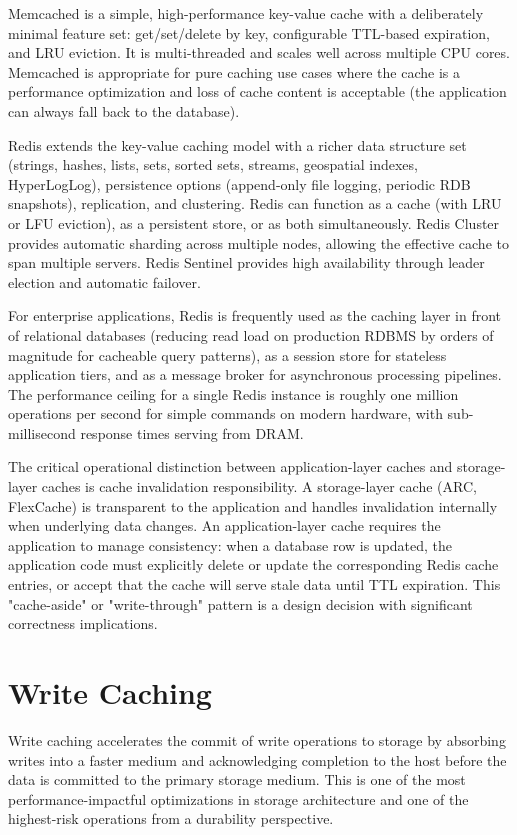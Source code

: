 Memcached is a simple, high-performance key-value cache with a deliberately minimal feature set: get/set/delete by key, configurable TTL-based expiration, and LRU eviction. It is multi-threaded and scales well across multiple CPU cores. Memcached is appropriate for pure caching use cases where the cache is a performance optimization and loss of cache content is acceptable (the application can always fall back to the database).

Redis extends the key-value caching model with a richer data structure set (strings, hashes, lists, sets, sorted sets, streams, geospatial indexes, HyperLogLog), persistence options (append-only file logging, periodic RDB snapshots), replication, and clustering. Redis can function as a cache (with LRU or LFU eviction), as a persistent store, or as both simultaneously. Redis Cluster provides automatic sharding across multiple nodes, allowing the effective cache to span multiple servers. Redis Sentinel provides high availability through leader election and automatic failover.

For enterprise applications, Redis is frequently used as the caching layer in front of relational databases (reducing read load on production RDBMS by orders of magnitude for cacheable query patterns), as a session store for stateless application tiers, and as a message broker for asynchronous processing pipelines. The performance ceiling for a single Redis instance is roughly one million operations per second for simple commands on modern hardware, with sub-millisecond response times serving from DRAM.

The critical operational distinction between application-layer caches and storage-layer caches is cache invalidation responsibility. A storage-layer cache (ARC, FlexCache) is transparent to the application and handles invalidation internally when underlying data changes. An application-layer cache requires the application to manage consistency: when a database row is updated, the application code must explicitly delete or update the corresponding Redis cache entries, or accept that the cache will serve stale data until TTL expiration. This "cache-aside" or "write-through" pattern is a design decision with significant correctness implications.

\section{Write Caching}
Write caching accelerates the commit of write operations to storage by absorbing writes into a faster medium and acknowledging completion to the host before the data is committed to the primary storage medium. This is one of the most performance-impactful optimizations in storage architecture and one of the highest-risk operations from a durability perspective.

